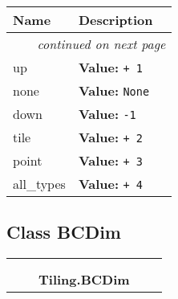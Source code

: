     \vspace{-1cm}
\hspace{\varindent}\begin{longtable}{|p{\varnamewidth}|p{\vardescrwidth}|l}
\cline{1-2}
\cline{1-2} \centering \textbf{Name} & \centering \textbf{Description}& \\
\cline{1-2}
\endhead\cline{1-2}\multicolumn{3}{r}{\small\textit{continued on next page}}\\\endfoot\cline{1-2}
\endlastfoot\raggedright u\-p\- & \raggedright \textbf{Value:} 
{\tt + 1}&\\
\cline{1-2}
\raggedright n\-o\-n\-e\- & \raggedright \textbf{Value:} 
{\tt None}&\\
\cline{1-2}
\raggedright d\-o\-w\-n\- & \raggedright \textbf{Value:} 
{\tt -1}&\\
\cline{1-2}
\raggedright t\-i\-l\-e\- & \raggedright \textbf{Value:} 
{\tt + 2}&\\
\cline{1-2}
\raggedright p\-o\-i\-n\-t\- & \raggedright \textbf{Value:} 
{\tt + 3}&\\
\cline{1-2}
\raggedright a\-l\-l\-\_\-t\-y\-p\-e\-s\- & \raggedright \textbf{Value:} 
{\tt + 4}&\\
\cline{1-2}
\end{longtable}



\subsection{Class BCDim}

    \label{Tiling:BCDim}
\begin{tabular}{cccccc}
\multicolumn{2}{r}{\settowidth{\BCL}{object}\multirow{2}{\BCL}{object}}
&&
  \\\cline{3-3}
  &&\multicolumn{1}{c|}{}
&&
  \\
&&\multicolumn{2}{l}{\textbf{Tiling.BCDim}}
\end{tabular}



